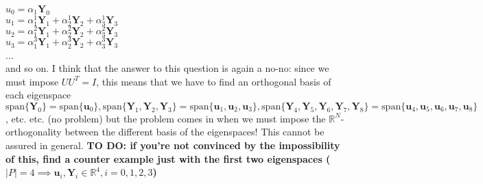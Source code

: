  $u_0 = \alpha_1\mathbf Y_0$\\
 $u_1 = \alpha_1^1 \mathbf Y_1 + \alpha_2^1 \mathbf Y_2+ \alpha_3^1 \mathbf Y_3$\\
 $u_2 = \alpha_1^2 \mathbf Y_1 + \alpha_2^2 \mathbf Y_2+ \alpha_3^2 \mathbf Y_3$\\
 $u_3 = \alpha_1^3 \mathbf Y_1 + \alpha_2^3 \mathbf Y_2+ \alpha_3^3 \mathbf Y_3$\\
 ...\\
 
 and so on. I think that the answer to this question is again a no-no: since we must impose $UU^T=I$, this means that we have to find an orthogonal basis of each eigenspace 
 $\text{span}\{\mathbf Y_0\} = \text{span}\{\mathbf u_0\},  \text{span}\{\mathbf Y_1, \mathbf Y_2, \mathbf Y_3\} = \text{span}\{\mathbf u_1, \mathbf u_2, \mathbf u_3\}, \text{span}\{\mathbf Y_4, \mathbf Y_5, \mathbf Y_6, \mathbf Y_7, \mathbf Y_8\}=\text{span}\{\mathbf u_4, \mathbf u_5, \mathbf u_6, \mathbf u_7, \mathbf u_8\}$, etc. etc. (no problem) but the problem comes in when we must impose the $\mathbb R^N$-orthogonality between the different basis of the eigenspaces! This cannot be assured in general. \textbf{TO DO: if you're not convinced by the impossibility of this, find a counter example just with the first two eigenspaces ($|P|=4 \implies \mathbf u_i, \mathbf Y_i \in \mathbb R^4, i=0,1,2,3$)}
